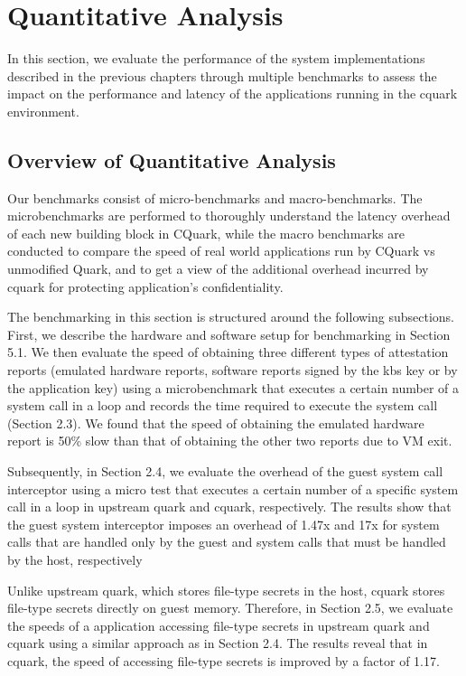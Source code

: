 \section{Quantitative Analysis}
In this section, we evaluate the performance of the system implementations described in the previous chapters through multiple benchmarks to assess the impact on the performance and latency of the applications running in the cquark environment.


\subsection{Overview of Quantitative Analysis}


Our benchmarks  consist of micro-benchmarks and macro-benchmarks. The microbenchmarks are performed to  thoroughly understand the latency overhead of each new building block in CQuark, while the macro benchmarks are conducted to compare the speed of 
real world applications run by CQuark vs unmodified Quark, and to get a view of the additional overhead incurred by cquark for protecting application’s confidentiality.


The benchmarking in this section is structured around the following subsections. First, we describe the hardware and software setup for benchmarking in Section 5.1. We then evaluate the speed of obtaining three different types of attestation reports (emulated hardware reports, software reports signed 
by the kbs key or by the application key) using a microbenchmark that executes a certain number of a system call in a loop and records the time required to execute the system call (Section 2.3). We found that the speed of obtaining the emulated hardware report is 50\% slow than that of obtaining the other two reports due to VM exit. 

Subsequently, in Section 2.4, we evaluate the overhead of the guest system call interceptor using a micro test that executes a certain number of a specific system call in a loop in upstream quark and cquark, respectively. The results show that the guest system interceptor imposes an overhead of 1.47x 
and 17x for system calls that are handled only by the guest and system calls that must be handled by the host, respectively

Unlike upstream quark, which stores file-type secrets in the host, cquark stores file-type secrets directly on guest memory. Therefore, in Section 2.5, we evaluate the speeds of a application accessing file-type secrets in upstream quark and cquark using a similar approach as in Section 2.4. 
The results reveal that in cquark, the speed of accessing file-type secrets is improved by a factor of 1.17.


